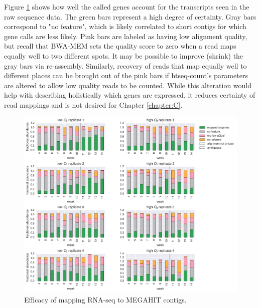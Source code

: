 
Figure \ref{fig:rna_mapping_bars} shows how well the called genes account for the transcripts seen in the raw sequence data.
The green bars represent a high degree of certainty.
Gray bars correspond to "no feature", which is likely correlated to short contigs for which gene calls are less likely.
Pink bars are labeled as having low alignment quality, but recall that BWA-MEM sets the quality score to zero when a read maps equally well to two different spots.
It may be possible to improve (shrink) the gray bars via re-assembly.
Similarly, recovery of reads that map equally well to different places can be brought out of the pink bars if htseq-count's parameters are altered to allow low quality reads to be counted.
While this alteration would help with describing holistically which genes are expressed, it reduces certainty of read mappings and is not desired for Chapter \ref{chapter:C}.


\begin{figure}[H]
\centering
    \includegraphics[width=1.0\textwidth]{./tex/chapter2/figures/170316_fracs_mapped_unmapped_etc.pdf}
    \begin{singlespace}
    \caption[Efficacy of mapping RNA-seq to MEGAHIT contigs]{
        Efficacy of mapping RNA-seq to MEGAHIT contigs.}
    \label{fig:rna_mapping_bars}
    \end{singlespace}
\end{figure}

